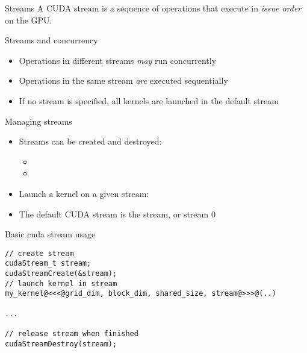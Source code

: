 \documentclass[aspectratio=43]{beamer}
\begin{document}
\begin{frame}[fragile]{Streams}
    A CUDA stream is a sequence of operations that execute in \emph{issue order} on the GPU.
    \medskip

    \begin{info}{Streams and concurrency}
        \begin{itemize}
            \item Operations in different streams \emph{may} run concurrently
            \item Operations in the same stream \emph{are} executed sequentially
            \item If no stream is specified, all kernels are launched in the default stream
        \end{itemize}
    \end{info}

\end{frame}

\begin{frame}[fragile]{Managing streams}
    \begin{itemize}
        \item Streams can be created and destroyed:
        \begin{itemize}
            \item {}
            \item {}
        \end{itemize}
        \item Launch a kernel on a given stream: \\
            \begin{center}  \end{center}
        \item The default CUDA stream is the  stream, or stream 0
    \end{itemize}

    \begin{code}{Basic cuda stream usage}
        \begin{lstlisting}[style=boxcudatiny]
// create stream
cudaStream_t stream;
cudaStreamCreate(&stream);
// launch kernel in stream
my_kernel@<<<@grid_dim, block_dim, shared_size, stream@>>>@(..)

...

// release stream when finished
cudaStreamDestroy(stream);
        \end{lstlisting}
\end{code}

\end{frame}
\end{document}
